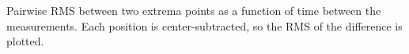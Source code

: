 Pairwise RMS between two extrema points as a function of time between the measurements. Each position is center-subtracted, so the RMS of the difference is plotted.
    